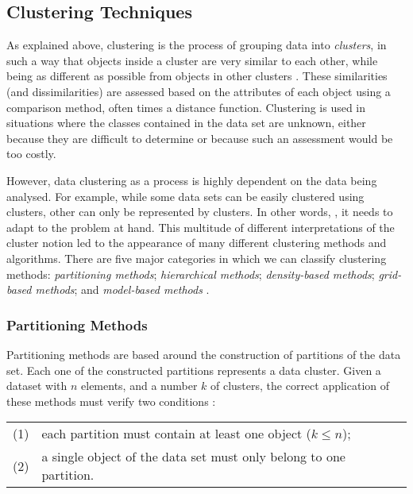 \subsection{Clustering Techniques}\label{sec:clustertech}

As explained above, clustering is the process of grouping data into
\emph{clusters}, in such a way that objects inside a cluster are very similar to
each other, while being as different as possible from objects in other clusters
\cite{han2006data}. These similarities (and dissimilarities) are assessed based
on the attributes of each object using a comparison method, often times a
distance function. Clustering is used in situations where the classes contained
in the data set are unknown, either because they are difficult to determine or
because such an assessment would be too costly.

However, data clustering as a process is highly dependent on the data being
analysed. For example, while some data sets can be easily clustered using
 clusters, other can only be represented by  clusters.
In other words,  \cite{Estivill-Castro:2002:WSM:568574.568575}, it needs to adapt to
the problem at hand. This multitude of different interpretations of the cluster
notion led to the appearance of many different clustering methods and
algorithms. There are five major categories in which we can classify clustering
methods: \emph{partitioning methods}; \emph{hierarchical methods};
\emph{density-based methods}; \emph{grid-based methods}; and \emph{model-based
methods} \cite{han2006data}.

\subsubsection*{Partitioning Methods}

Partitioning methods are based around the construction of partitions of the data
set. Each one of the constructed partitions represents a data cluster. Given a
dataset with $n$ elements, and a number $k$ of clusters, the correct application
of these methods must verify two conditions \cite{han2006data}:\\

\begin{tabular}{l l}
  (1) & each partition must contain at least one object ($k \leq n$);\\
  (2) & a single object of the data set must only belong to one partition.\\
\end{tabular}\\

